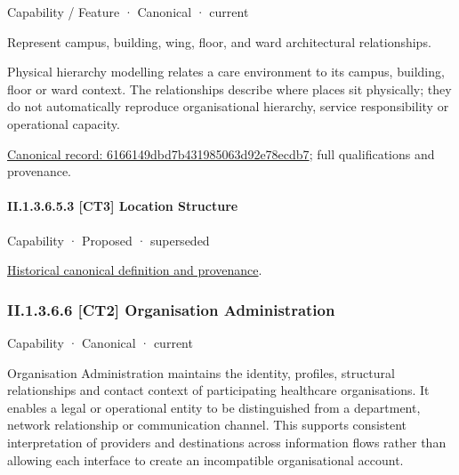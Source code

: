 \label{element:6166149dbd7b431985063d92e78ecdb7}
{\small Capability / Feature · Canonical · current}\par

Represent campus, building, wing, floor, and ward architectural relationships.



Physical hierarchy modelling relates a care environment to its campus, building, floor or ward context. The relationships describe where places sit physically; they do not automatically reproduce organisational hierarchy, service responsibility or operational capacity.


{\footnotesize \href{../../../../continuum/strategy/capability/feature/6166149dbd7b431985063d92e78ecdb7.md}{Canonical record: 6166149dbd7b431985063d92e78ecdb7}; full qualifications and provenance.}\par
\paragraph*{II.1.3.6.5.3 [CT3] Location Structure}
\label{navigation:II.1.3.6.5.3}

\label{element:2436c87195334daf85ed4e2de4ec4bd5}
{\small Capability · Proposed · superseded}\par
\href{../../../../continuum/strategy/capability/2436c87195334daf85ed4e2de4ec4bd5.md}{Historical canonical definition and provenance}.\par
\subsubsection*{II.1.3.6.6 [CT2] Organisation Administration}
\label{navigation:II.1.3.6.6}

\label{element:14fbdc5ce3dd4c2092c5397dab3ed743}
{\small Capability · Canonical · current}\par

Organisation Administration maintains the identity, profiles, structural relationships and contact context of participating healthcare organisations. It enables a legal or operational entity to be distinguished from a department, network relationship or communication channel. This supports consistent interpretation of providers and destinations across information flows rather than allowing each interface to create an incompatible organisational account.



